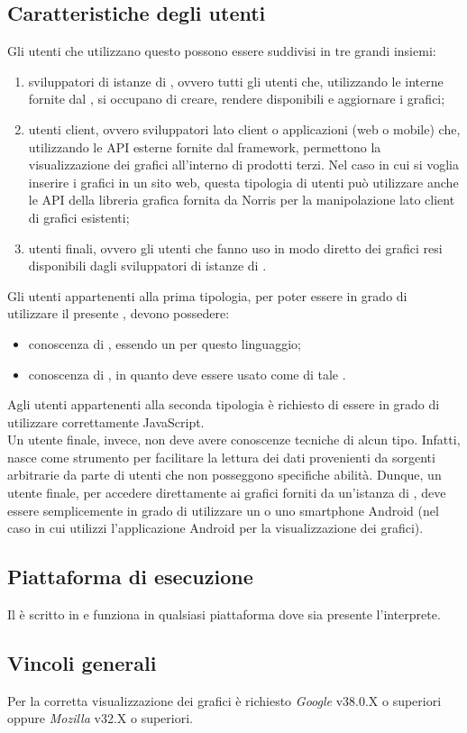 	\subsection{Caratteristiche degli utenti}
		Gli utenti che utilizzano questo  possono essere suddivisi in tre grandi insiemi:
		\begin{enumerate}
			\item sviluppatori di istanze di , ovvero tutti gli utenti che, utilizzando le  interne fornite dal , si occupano di creare, rendere disponibili e aggiornare i grafici;
			\item utenti client, ovvero sviluppatori lato client o applicazioni (web o mobile) che, utilizzando le API esterne fornite dal framework, permettono la visualizzazione dei grafici all'interno di prodotti terzi. Nel caso in cui si voglia inserire i grafici in un sito web, questa tipologia di utenti può utilizzare anche le API della libreria grafica fornita da Norris per la manipolazione lato client di grafici esistenti;
			\item utenti finali, ovvero gli utenti che fanno uso in modo diretto dei grafici resi disponibili dagli sviluppatori di istanze di .
		\end{enumerate}
		Gli utenti appartenenti alla prima tipologia, per poter essere in grado di utilizzare il presente , devono possedere:
		\begin{itemize}
			\item conoscenza di , essendo  un  per questo linguaggio;
			\item conoscenza di , in quanto  deve essere usato come  di tale .
		\end{itemize}
		Agli utenti appartenenti alla seconda tipologia è richiesto di essere in grado di utilizzare correttamente JavaScript.\\
		Un utente finale, invece, non deve avere conoscenze tecniche di alcun tipo. Infatti,  nasce come strumento per facilitare la lettura dei dati provenienti da sorgenti arbitrarie da parte di utenti che non posseggono specifiche abilità. Dunque, un utente finale, per accedere direttamente ai grafici forniti da un'istanza di , deve essere semplicemente in grado di utilizzare un  o uno smartphone Android (nel caso in cui utilizzi l'applicazione Android per la visualizzazione dei grafici).\\
	\subsection{Piattaforma di esecuzione}
		Il  è scritto in  e funziona in qualsiasi piattaforma dove sia presente l'interprete.
	\subsection{Vincoli generali}
		Per la corretta visualizzazione dei grafici è richiesto \emph{Google } v38.0.X o superiori oppure \emph{Mozilla } v32.X o superiori.

